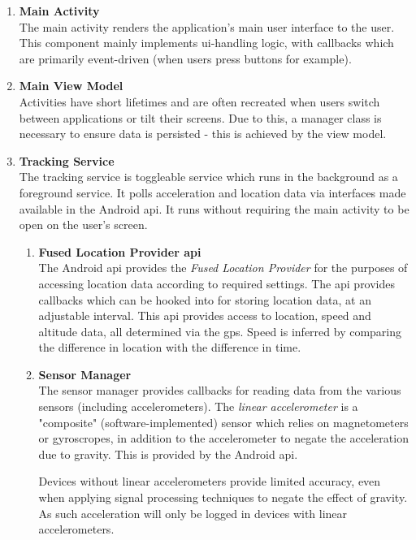 \begin{enumerate}
\item \textbf{Main Activity}\\
The main activity renders the application's main user interface to the user.
This component mainly implements \Ac{ui}-handling logic, with callbacks which are primarily event-driven (when users press buttons for example).
\item \textbf{Main View Model}\\
Activities have short lifetimes and are often recreated when users switch between applications or tilt their screens.
Due to this, a manager class is necessary to ensure data is persisted - this is achieved by the view model.
\item \textbf{Tracking Service}\\
The tracking service is toggleable service which runs in the background as a foreground service.
It polls acceleration and location data via interfaces made available in the Android \ac{api}.
It runs without requiring the main activity to be open on the user's screen.
\begin{enumerate}
\item \textbf{Fused Location Provider \ac{api}}\\
The Android \ac{api} provides the \textit{Fused Location Provider} for the purposes of accessing location data according to required settings.
The \ac{api} provides callbacks which can be hooked into for storing location data, at an adjustable interval.
This \ac{api} provides access to location, speed and altitude data, all determined via the \ac{gps}.
Speed is inferred by comparing the difference in location with the difference in time.
\item \textbf{Sensor Manager}\\
The sensor manager provides callbacks for reading data from the various sensors (including accelerometers).
The \textit{linear accelerometer} is a "composite" (software-implemented) sensor which relies on magnetometers or gyroscropes, in addition to the accelerometer to negate the acceleration due to gravity.
This is provided by the Android \ac{api}.

Devices without linear accelerometers provide limited accuracy, even when applying signal processing techniques to negate the effect of gravity.
As such acceleration will only be logged in devices with linear accelerometers.
\end{enumerate}


\end{enumerate}
